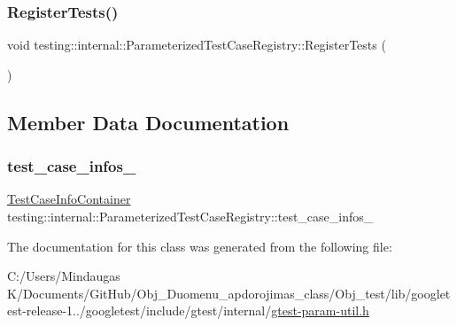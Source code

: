 \mbox{\label{classtesting_1_1internal_1_1_parameterized_test_case_registry_ad5b63c8fe94f3d51d039a76c001c9223}} 
\subsubsection{\texorpdfstring{RegisterTests()}{RegisterTests()}}
{\footnotesize\ttfamily void testing\+::internal\+::\+Parameterized\+Test\+Case\+Registry\+::\+Register\+Tests (\begin{DoxyParamCaption}{ }\end{DoxyParamCaption})\hspace{0.3cm}{\ttfamily [inline]}}



\subsection{Member Data Documentation}
\mbox{\label{classtesting_1_1internal_1_1_parameterized_test_case_registry_a10be2f29d41be96c14d976f0cda3d0f7}} 
\subsubsection{\texorpdfstring{test\_case\_infos\_}{test\_case\_infos\_}}
{\footnotesize\ttfamily \mbox{\hyperlink{classtesting_1_1internal_1_1_parameterized_test_case_registry_a4b2cde8f4f92749a8f685f33a9a3f7bf}{Test\+Case\+Info\+Container}} testing\+::internal\+::\+Parameterized\+Test\+Case\+Registry\+::test\+\_\+case\+\_\+infos\+\_\+\hspace{0.3cm}{\ttfamily [private]}}



The documentation for this class was generated from the following file\+:\begin{DoxyCompactItemize}
\item 
C\+:/\+Users/\+Mindaugas K/\+Documents/\+Git\+Hub/\+Obj\+\_\+\+Duomenu\+\_\+apdorojimas\+\_\+class/\+Obj\+\_\+test/lib/googletest-\/release-\/1../googletest/include/gtest/internal/\mbox{\hyperlink{_obj__test_2lib_2googletest-release-1_88_81_2googletest_2include_2gtest_2internal_2gtest-param-util_8h}{gtest-\/param-\/util.\+h}}\end{DoxyCompactItemize}

